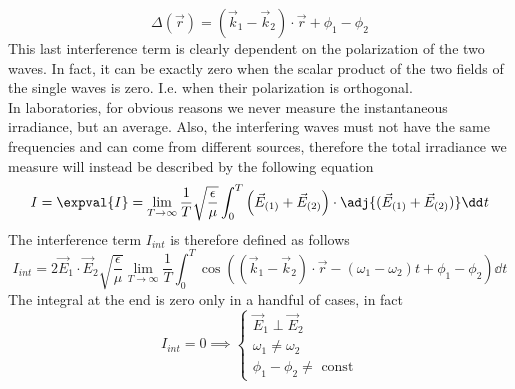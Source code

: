 \documentclass[../electromagnetism.tex]{subfiles}
\begin{document}
\begin{equation}
	\Delta(\vec{r})=(\vec{k}_1-\vec{k}_2)\cdot\vec{r}+\phi_1-\phi_2
	\label{eq:Deltar.int}
\end{equation}
This last interference term is clearly dependent on the polarization of the two waves. In fact, it can be exactly zero when the scalar product of the two fields of the single waves is zero. I.e. when their polarization is orthogonal.\\
In laboratories, for obvious reasons we never measure the instantaneous irradiance, but an average. Also, the interfering waves must not have the same frequencies and can come from different sources, therefore the total irradiance we measure will instead be described by the following equation
\begin{equation}
	I=\expval{I}=\lim_{T\to\infty}\frac{1}{T}\sqrt{\frac{\epsilon}{\mu}}\int_{0}^{T}\left( \vec{E}_{(1)}+\vec{E}_{(2)} \right)\cdot\adj{(\vec{E}_{(1)}+\vec{E}_{(2)})}\dd^{}{t}
	\label{eq:iexpval.int}
\end{equation}
The interference term $I_{int}$ is therefore defined as follows
\begin{equation}
	I_{int}=2\vec{E}_1\cdot\vec{E}_2\sqrt{\frac{\epsilon}{\mu}}\lim_{T\to\infty}\frac{1}{T}\int_{0}^{T}\cos\left( \left( \vec{k}_1-\vec{k}_2 \right)\cdot\vec{r}-(\omega_1-\omega_2)t +\phi_1-\phi_2\right)\dd^{}{t}
	\label{eq:inttermreal.int}
\end{equation}
The integral at the end is zero only in a handful of cases, in fact
\begin{equation}
	I_{int}=0\implies\begin{cases}
		\vec{E}_1\perp\vec{E}_2\\
		\omega_1\ne\omega_2\\
		\phi_1-\phi_2\ne\text{ const}
	\end{cases}
	\label{eq:casesnoint.int}
\end{equation}
\end{document}
